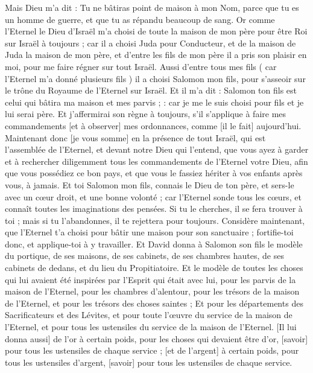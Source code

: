 \begin{multicols}{2}
Mais Dieu m'a dit : Tu ne bâtiras point de maison à mon Nom, parce que tu es un homme de guerre, et que tu as répandu beaucoup de sang.
Or comme l'Eternel le Dieu d'Israël m'a choisi de toute la maison de mon père pour être Roi sur Israël à toujours ; car il a choisi Juda pour Conducteur, et de la maison de Juda la maison de mon père, et d'entre les fils de mon père il a pris son plaisir en moi, pour me faire régner sur tout Israël.
Aussi d'entre tous mes fils ( car l'Eternel m'a donné plusieurs fils ) il a choisi Salomon mon fils, pour s'asseoir sur le trône du Royaume de l'Eternel sur Israël.
Et il m'a dit : Salomon ton fils est celui qui bâtira ma maison et mes parvis ; : car je me le suis choisi pour fils et je lui serai père.
Et j'affermirai son règne à toujours, s'il s'applique à faire mes commandements [et à observer] mes ordonnances, comme [il le fait] aujourd'hui.
Maintenant donc [je vous somme] en la présence de tout Israël, qui est l'assemblée de l'Eternel, et devant notre Dieu qui l'entend, que vous ayez à garder et à rechercher diligemment tous les commandements de l'Eternel votre Dieu, afin que vous possédiez ce bon pays, et que vous le fassiez hériter à vos enfants après vous, à jamais.
Et toi Salomon mon fils, connais le Dieu de ton père, et sers-le avec un cœur droit, et une bonne volonté ; car l'Eternel sonde tous les cœurs, et connaît toutes les imaginations des pensées. Si tu le cherches, il se fera trouver à toi ; mais si tu l'abandonnes, il te rejettera pour toujours.
Considère maintenant, que l'Eternel t'a choisi pour bâtir une maison pour son sanctuaire ; fortifie-toi donc, et applique-toi à y travailler.
Et David donna à Salomon son fils le modèle du portique, de ses maisons, de ses cabinets, de ses chambres hautes, de ses cabinets de dedans, et du lieu du Propitiatoire.
Et le modèle de toutes les choses qui lui avaient été inspirées par l'Esprit qui était avec lui, pour les parvis de la maison de l'Eternel, pour les chambres d'alentour, pour les trésors de la maison de l'Eternel, et pour les trésors des choses saintes ;
Et pour les départements des Sacrificateurs et des Lévites, et pour toute l'œuvre du service de la maison de l'Eternel, et pour tous les ustensiles du service de la maison de l'Eternel.
[Il lui donna aussi] de l'or à certain poids, pour les choses qui devaient être d'or, [savoir] pour tous les ustensiles de chaque service ; [et de l'argent] à certain poids, pour tous les ustensiles d'argent, [savoir] pour tous les ustensiles de chaque service.

\end{multicols}
